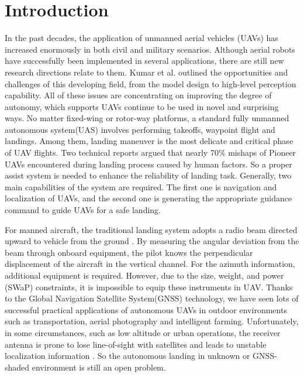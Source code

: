\section{Introduction}
\label{intro}
In the past decades, the application of unmanned aerial vehicles (UAVs) has increased enormously in both civil and military scenarios. Although aerial robots have successfully been implemented in several applications, there are still new research directions relate to them. Kumar et al. \cite{kumar2012opportunities} outlined the opportunities and challenges of this developing field, from the model design to high-level perception capability. All of these issues are concentrating on improving the degree of autonomy, which supports UAVs continue to be used in novel and surprising ways.
No matter fixed-wing or rotor-way platforms, a standard fully unmanned autonomous system(UAS) involves performing takeoffs, waypoint flight and landings. Among them, landing maneuver is the most delicate and critical phase of UAV flights. Two technical reports \cite{williams2004summary,manning2004role} argued that nearly 70\% mishaps of Pioneer UAVs encountered during landing process caused by human factors. So a proper assist system is needed to enhance the reliability of landing task. Generally, two main capabilities of the system are required. The first one is navigation and localization of UAVs, and the second one is generating the appropriate guidance command to guide UAVs for a safe landing. 

For manned aircraft, the traditional landing system adopts a radio beam directed upward to vehicle from the ground \cite{mclean1990automatic, stevens2003aircraft}. By measuring the angular deviation from the beam through onboard equipment, the pilot knows the perpendicular displacement of the aircraft in the vertical channel. For the azimuth information, additional equipment is required. However, due to the size, weight, and power (SWaP) constraints, it is impossible to equip these instruments in UAV. Thanks to the Global Navigation Satellite System(GNSS) technology, we have seen lots of successful practical applications of autonomous UAVs in outdoor environments such as transportation, aerial photography and intelligent farming. Unfortunately, in some circumstances, such as low altitude or urban operations, the receiver antenna is prone to lose line-of-sight with satellites and leads to unstable localization information \cite{farrell1998gps}. So the autonomous landing in unknown or GNSS-shaded environment is still an open problem. 

